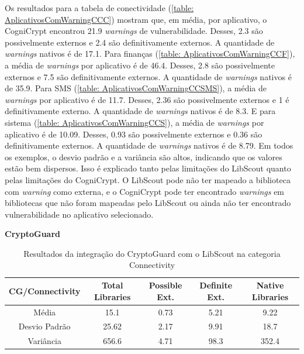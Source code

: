 Os resultados para a tabela de conectividade (\ref{table: AplicativosComWarningCCC}) mostram que, em média, por aplicativo, o CogniCrypt encontrou \num{21.9} \textit{warnings} de vulnerabilidade. Desses, \num{2.3} são possivelmente externos e \num{2.4} são definitivamente externos. A quantidade de \textit{warnings} nativos é de \num{17.1}.
Para finanças (\ref{table: AplicativosComWarningCCF}), a média de \textit{warnings} por aplicativo é de \num{46.4}. Desses, \num{2.8} são possivelmente externos e \num{7.5} são definitivamente externos. A quantidade de \textit{warnings} nativos é de \num{35.9}. 
Para SMS (\ref{table: AplicativosComWarningCCSMS}), a média de \textit{warnings} por aplicativo é de \num{11.7}. Desses, \num{2.36} são possivelmente externos e \num{1} é definitivamente externo. A quantidade de \textit{warnings} nativos é de \num{8.3}.
E para sistema (\ref{table: AplicativosComWarningCCS}), a média de \textit{warnings} por aplicativo é de \num{10.09}. Desses, \num{0.93} são possivelmente externos e \num{0.36} são definitivamente externos. A quantidade de \textit{warnings} nativos é de \num{8.79}.
Em todos os exemplos, o desvio padrão e a variância são altos, indicando que os valores estão bem dispersos. Isso é explicado tanto pelas limitações do LibScout quanto pelas limitações do CogniCrypt. O LibScout pode não ter mapeado a biblioteca com \textit{warning} como externa, e o CogniCrypt pode ter encontrado \textit{warnings} em bibliotecas que não foram mapeadas pelo LibScout ou ainda não ter encontrado vulnerabilidade no aplicativo selecionado.

\textbf{CryptoGuard}

\begin{table}[!htbp]
  \centering
  \small
  \begin{tabular}{|c|c|c|c|c|}
    \hline
    \textbf{CG/Connectivity} & \textbf{Total Libraries} & \textbf{Possible Ext.} & \textbf{Definite Ext.} & \textbf{Native Libraries} \\
    \hline
    Média & \num{15.1} & \num{0.73} & \num{5.21} & \num{9.22} \\
    Desvio Padrão & \num{25.62} & \num{2.17} & \num{9.91} & \num{18.7} \\
    Variância & \num{656.6} & \num{4.71} & \num{98.3} & \num{352.4} \\
    \hline
  \end{tabular}
  \caption{Resultados da integração do CryptoGuard com o LibScout na categoria Connectivity}
  \label{table: AplicativosComWarningCGC}
\end{table}


